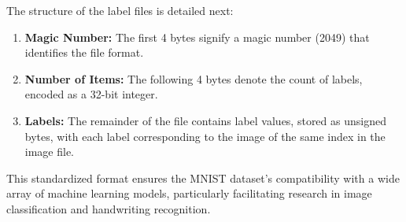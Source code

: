 The structure of the label files is detailed next:
\begin{enumerate}
    \item \textbf{Magic Number:} The first 4 bytes signify a magic number (2049) that identifies the file format.
    \item \textbf{Number of Items:} The following 4 bytes denote the count of labels, encoded as a 32-bit integer.
    \item \textbf{Labels:} The remainder of the file contains label values, stored as unsigned bytes, with each label corresponding to the image of the same index in the image file.
\end{enumerate}

This standardized format ensures the MNIST dataset's compatibility with a wide array of machine learning models, particularly facilitating research in image classification and handwriting recognition.

